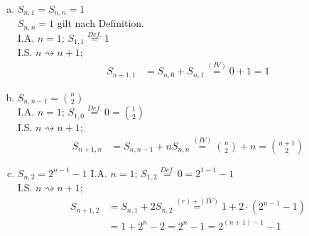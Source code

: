 \documentclass[11pt,a4paper,ngerman]{article}
\begin{document}
\begin{enumerate}[a)]
\item $S_{n,1} = S_{n,n} = 1$ \\
$S_{n,n} = 1$ gilt nach Definition. \\
I.A. $n=1$; $S_{1,1} \stackrel{Def.}{=} 1 $ \\
I.S. $n \rightsquigarrow n+1$;
  \begin{equation*}\begin{split}
    S_{n+1,1} &= S_{n,0} + S_{n,1} \stackrel{(IV)}{=}0 + 1 = 1\end{split}\end{equation*}
\item $S_{n,n-1} = \binom{n}{2}$ \\
I.A. $n=1$; $S_{1,0} \stackrel{Def.}{=} 0 = \binom{1}{2} $ \\
I.S. $n \rightsquigarrow n+1$;
  \begin{equation*}\begin{split}
    S_{n+1,n} &= S_{n,n-1} + n S_{n,n} \stackrel{(IV)}{=} \binom{n}{2} + n = \binom{n+1}{2}
  \end{split}\end{equation*}
\item $S_{n,2} = 2^{n-1} -1 $
I.A. $n=1$; $S_{1,2} \stackrel{Def.}{=} 0 = 2^{1-1} - 1 $ \\
I.S. $n \rightsquigarrow n+1$;
  \begin{equation*}\begin{split}
    S_{n+1,2} &= S_{n,1} + 2 S_{n,2} \stackrel{(e)+(IV)}{=} 1 + 2\cdot (2^{n-1} -1) \\
              &= 1+ 2^n - 2 = 2^n - 1 = 2^{(n+1)-1} - 1
  \end{split}\end{equation*}

\end{enumerate}

\label{LastPage}
\end{document}
